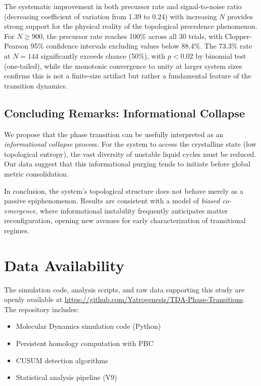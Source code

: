 \documentclass[twocolumn,showpacs,preprintnumbers,amsmath,amssymb,prb,floatfix]{revtex4-2}
\begin{document}
The systematic improvement in both precursor rate and signal-to-noise ratio (decreasing coefficient of variation from 1.39 to 0.24) with increasing $N$ provides strong support for the physical reality of the topological precedence phenomenon. For $N \geq 900$, the precursor rate reaches 100\% across all 30 trials, with Clopper-Pearson 95\% confidence intervals excluding values below 88.4\%. The 73.3\% rate at $N=144$ significantly exceeds chance (50\%), with $p < 0.02$ by binomial test (one-tailed), while the monotonic convergence to unity at larger system sizes confirms this is not a finite-size artifact but rather a fundamental feature of the transition dynamics.

\subsection{Concluding Remarks: Informational Collapse}

We propose that the phase transition can be usefully interpreted as an \textit{informational collapse} process. For the system to access the crystalline state (low topological entropy), the vast diversity of unstable liquid cycles must be reduced. Our data suggest that this informational purging tends to initiate before global metric consolidation.

In conclusion, the system's topological structure does not behave merely as a passive epiphenomenon. Results are consistent with a model of \textit{biased co-emergence}, where informational instability frequently anticipates matter reconfiguration, opening new avenues for early characterization of transitional regimes.

\section*{Data Availability}

The simulation code, analysis scripts, and raw data supporting this study are openly available at \url{https://github.com/Yatrogenesis/TDA-Phase-Transitions}. The repository includes:
\begin{itemize}
    \item Molecular Dynamics simulation code (Python)
    \item Persistent homology computation with PBC
    \item CUSUM detection algorithms
    \item Statistical analysis pipeline (V9)
\end{itemize}
\end{document}
